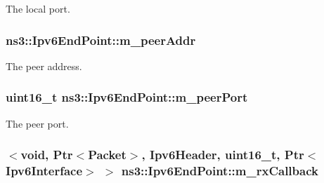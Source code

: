 The local port. 

\subsubsection[{\texorpdfstring{m\+\_\+peer\+Addr}{m_peerAddr}}]{ ns3\+::\+Ipv6\+End\+Point\+::m\+\_\+peer\+Addr\hspace{0.3cm}{\ttfamily [private]}}\hypertarget{classns3_1_1Ipv6EndPoint_a41293a8c07dc1bfc523a5b6eb1878234}{}\label{classns3_1_1Ipv6EndPoint_a41293a8c07dc1bfc523a5b6eb1878234}


The peer address. 

\subsubsection[{\texorpdfstring{m\+\_\+peer\+Port}{m_peerPort}}]{\setlength{\rightskip}{0pt plus 5cm}uint16\+\_\+t ns3\+::\+Ipv6\+End\+Point\+::m\+\_\+peer\+Port\hspace{0.3cm}{\ttfamily [private]}}\hypertarget{classns3_1_1Ipv6EndPoint_a104e59d9ecccdfdc79639cd1d7a77f46}{}\label{classns3_1_1Ipv6EndPoint_a104e59d9ecccdfdc79639cd1d7a77f46}


The peer port. 

\subsubsection[{\texorpdfstring{m\+\_\+rx\+Callback}{m_rxCallback}}]{$<$void, {\bf Ptr}$<${\bf Packet}$>$, {\bf Ipv6\+Header}, uint16\+\_\+t, {\bf Ptr}$<${\bf Ipv6\+Interface}$>$ $>$ ns3\+::\+Ipv6\+End\+Point\+::m\+\_\+rx\+Callback\hspace{0.3cm}{\ttfamily [private]}}\hypertarget{classns3_1_1Ipv6EndPoint_a3c0d453fd0bba4dd65e228a07dd2cc10}{}\label{classns3_1_1Ipv6EndPoint_a3c0d453fd0bba4dd65e228a07dd2cc10}


